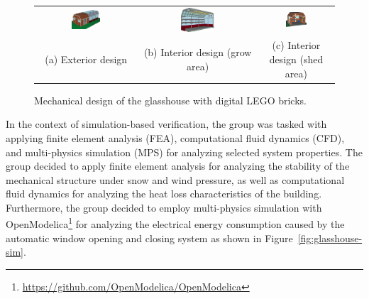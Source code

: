 \documentclass{PDS}
\begin{document}
\begin{figure}[htbp]
    \begin{center}
        \begin{tabular}{ccc}
            \includegraphics[width=0.3\textwidth]{./figures/glasshouse_1.png} &
            \includegraphics[width=0.3\textwidth]{./figures/glasshouse_2.png} &
            \includegraphics[width=0.3\textwidth]{./figures/glasshouse_3.png} \\
            (a) Exterior design &
            (b) Interior design (grow area) &
            (c) Interior design (shed area)
        \end{tabular}
    \end{center}
    \caption{Mechanical design of the glasshouse with digital LEGO bricks.}
    \label{fig:glasshouse}
\end{figure}

In the context of simulation-based verification, the group was tasked with applying finite element analysis (FEA), computational fluid dynamics (CFD), and multi-physics simulation (MPS) for analyzing selected system properties.
The group decided to apply finite element analysis for analyzing the stability of the mechanical structure under snow and wind pressure, as well as computational fluid dynamics for analyzing the heat loss characteristics of the building.
Furthermore, the group decided to employ multi-physics simulation with OpenModelica\footnote{\url{https://github.com/OpenModelica/OpenModelica}} for analyzing the electrical energy consumption caused by the automatic window opening and closing system as shown in Figure~\ref{fig:glasshouse-sim}.
\end{document}
